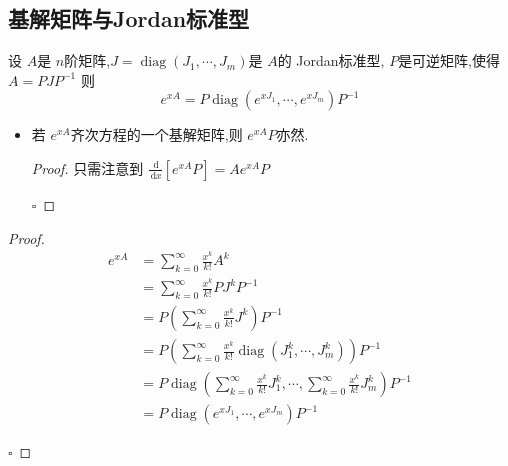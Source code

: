 \documentclass[lang=cn,12pt,color=green,fontset=none]{elegantbook}
\begin{document}
\subsection{基解矩阵与Jordan标准型}
 \begin{lemma}
    设 $ A $是 $ n $阶矩阵,$ J = \operatorname{diag}\left( J_1,\cdots ,J_{m} \right)  $是 $ A $的 Jordan标准型, $ P $是可逆矩阵,使得 $ A = PJP ^{-1}  $  则 $$
    e^{xA} = P \operatorname{diag}\left( e^{x J_{1}},\cdots ,e^{x J_{m}}\right)P ^{-1}  
    $$    
 \end{lemma}
 \begin{remark}
    \begin{itemize}
        \item   若 $ e^{xA} $齐次方程的一个基解矩阵,则 $ e^{xA}P $亦然.
        \begin{proof}
            只需注意到 $ \frac{\,\mathrm{d}  }{\,\mathrm{d} x } [e^{xA}P]= A e^{xA}P  $ 
        
            \hfill $\square$
        \end{proof}
    \end{itemize}
    
 \end{remark}
 \begin{proof}
    $$
    \begin{aligned}
    e^{xA} &= \sum _{k=0}^{\infty} \frac{x^{k} }{k! } A^{k}  \\ 
     & = \sum _{k=0}^{\infty} \frac{x^{k} }{k! } P J^{k} P ^{-1} \\ 
      & = P \left( \sum _{k=0}^{\infty} \frac{x^{k} }{ k!}J^{k}  \right)P ^{-1} \\ 
       & = P\left( \sum _{k=0}^{\infty} \frac{x^{k} }{k! } \operatorname{diag}\left( J_1^{k},\cdots ,J_{m}^{k} \right)   \right)    P ^{-1} \\ 
        & =P \operatorname{diag}\left(  \sum _{k=0}^{\infty} \frac{x^{k} }{k!}J_{1}^{k},\cdots , \sum _{k=0}^{\infty}\frac{x^{k} }{k! } J_{m}^{k}    \right) P ^{-1} \\ 
         & = P \operatorname{diag}\left( e^{xJ_1},\cdots ,e^{xJ_{m}} \right) P ^{-1} 
    \end{aligned}
    $$
 
    \hfill $\square$
 \end{proof}
\end{document}
